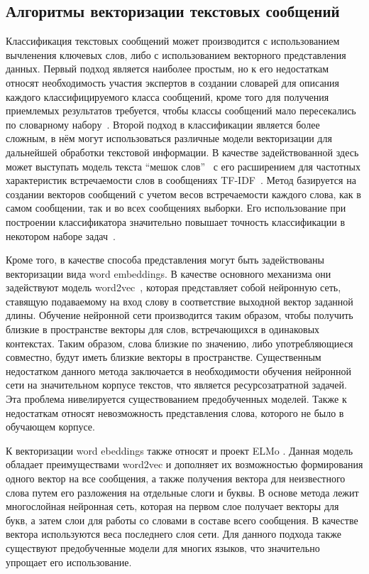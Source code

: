 \subsection{Алгоритмы векторизации текстовых сообщений}

Классификация текстовых сообщений может производится с использованием вычленения ключевых слов, либо с использованием векторного представления данных.
Первый подход является наиболее простым, но к его недостаткам относят необходимость участия экспертов в создании словарей для описания каждого классифицируемого класса сообщений, кроме того для получения приемлемых результатов требуется, чтобы классы сообщений мало пересекались по словарному набору~\cite{vectorizations}.
Второй подход в классификации является более сложным, в нём могут использоваться различные модели векторизации для дальнейшей обработки текстовой информации.
В качестве задействованной здесь может выступать модель текста ``мешок слов''~\cite{bagOfWords} с его расширением для частотных характеристик встречаемости слов в сообщениях TF-IDF~\cite{tfIdf}.
Метод базируется на создании векторов сообщений с учетом весов встречаемости каждого слова, как в самом сообщении, так и во всех сообщениях выборки.
Его использование при построении классификатора значительно повышает точность классификации в некотором наборе задач~\cite{vectorizations}.

Кроме того, в качестве способа представления могут быть задействованы векторизации вида word embeddings.
В качестве основного механизма они задействуют модель word2vec~\cite{word2vec}, которая представляет собой нейронную сеть, ставящую подаваемому на вход слову в соответствие выходной вектор заданной длины.
Обучение нейронной сети производится таким образом, чтобы получить близкие в пространстве векторы для слов, встречающихся в одинаковых контекстах.
Таким образом, слова близкие по значению, либо употребляющиеся совместно, будут иметь близкие векторы в пространстве.
Существенным недостатком данного метода заключается в необходимости обучения нейронной сети на значительном корпусе текстов, что является ресурсозатратной задачей.
Эта проблема нивелируется существованием предобученных моделей.
Также к недостаткам относят невозможность представления слова, которого не было в обучающем корпусе.~\cite{vectorizations}

К векторизации word ebeddings также относят и проект ELMo \cite{elmo}. Данная модель обладает преимуществами word2vec и дополняет их возможностью формирования одного вектор на все сообщения, а также получения вектора для неизвестного слова путем его разложения на отдельные слоги и буквы.
В основе метода лежит многослойная нейронная сеть, которая на первом слое получает векторы для букв, а затем слои для работы со словами в составе всего сообщения.
В качестве вектора используются веса последнего слоя сети. Для данного подхода также существуют предобученные модели для многих языков, что значительно упрощает его использование.~\cite{vectorizations}

